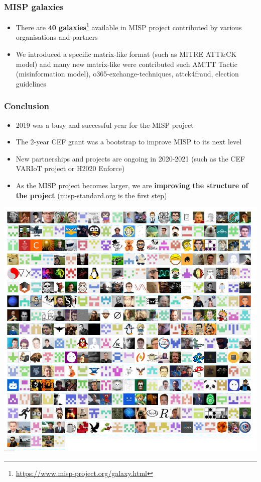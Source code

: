 \begin{frame}
        \frametitle{MISP galaxies}
        \begin{itemize}
                \item There are {\bf 40 galaxies}\footnote{\url{https://www.misp-project.org/galaxy.html}} available in MISP project contributed by various organisations and partners
                \item We introduced a specific matrix-like format (such as MITRE ATT\&CK model) and many new matrix-like were contributed such AM!TT Tactic (misinformation model), o365-exchange-techniques, attck4fraud, election guidelines
        \end{itemize}
\end{frame}


\begin{frame}
        \frametitle{Conclusion}
        \begin{itemize}
                \item 2019 was a busy and successful year for the MISP project
                \item The 2-year CEF grant was a bootstrap to improve MISP to its next level
                \item New partnerships and projects are ongoing in 2020-2021 (such as the CEF VARIoT project or H2020 Enforce)
                \item As the MISP project becomes larger, we are {\bf improving the structure of the project} (misp-standard.org is the first step)
        \end{itemize}
\end{frame}

\begin{frame}
        \includegraphics[scale=0.3]{misp-core-contributors.png}
\end{frame}

